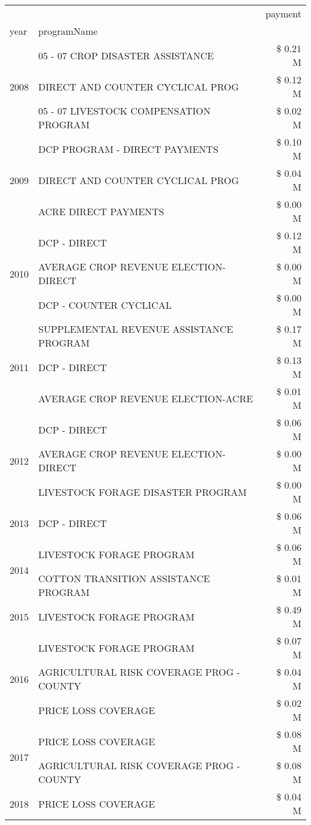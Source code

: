 \begin{tabular}{llr}
\toprule
 &  & payment \\
year & programName &  \\
\midrule
\multirow[t]{3}{*}{2008} & 05 - 07 CROP DISASTER ASSISTANCE & \$ 0.21 M \\
 & DIRECT AND COUNTER CYCLICAL PROG & \$ 0.12 M \\
 & 05 - 07 LIVESTOCK COMPENSATION PROGRAM & \$ 0.02 M \\
\cline{1-3}
\multirow[t]{3}{*}{2009} & DCP PROGRAM - DIRECT PAYMENTS & \$ 0.10 M \\
 & DIRECT AND COUNTER CYCLICAL PROG & \$ 0.04 M \\
 & ACRE DIRECT PAYMENTS & \$ 0.00 M \\
\cline{1-3}
\multirow[t]{3}{*}{2010} & DCP - DIRECT & \$ 0.12 M \\
 & AVERAGE CROP REVENUE ELECTION-DIRECT & \$ 0.00 M \\
 & DCP - COUNTER CYCLICAL & \$ 0.00 M \\
\cline{1-3}
\multirow[t]{3}{*}{2011} & SUPPLEMENTAL REVENUE ASSISTANCE PROGRAM & \$ 0.17 M \\
 & DCP - DIRECT & \$ 0.13 M \\
 & AVERAGE CROP REVENUE ELECTION-ACRE & \$ 0.01 M \\
\cline{1-3}
\multirow[t]{3}{*}{2012} & DCP - DIRECT & \$ 0.06 M \\
 & AVERAGE CROP REVENUE ELECTION-DIRECT & \$ 0.00 M \\
 & LIVESTOCK FORAGE DISASTER PROGRAM & \$ 0.00 M \\
\cline{1-3}
2013 & DCP - DIRECT & \$ 0.06 M \\
\cline{1-3}
\multirow[t]{2}{*}{2014} & LIVESTOCK FORAGE PROGRAM & \$ 0.06 M \\
 & COTTON TRANSITION ASSISTANCE PROGRAM & \$ 0.01 M \\
\cline{1-3}
2015 & LIVESTOCK FORAGE PROGRAM & \$ 0.49 M \\
\cline{1-3}
\multirow[t]{3}{*}{2016} & LIVESTOCK FORAGE PROGRAM & \$ 0.07 M \\
 & AGRICULTURAL RISK COVERAGE PROG - COUNTY & \$ 0.04 M \\
 & PRICE LOSS COVERAGE & \$ 0.02 M \\
\cline{1-3}
\multirow[t]{2}{*}{2017} & PRICE LOSS COVERAGE & \$ 0.08 M \\
 & AGRICULTURAL RISK COVERAGE PROG - COUNTY & \$ 0.08 M \\
\cline{1-3}
\multirow[t]{2}{*}{2018} & PRICE LOSS COVERAGE & \$ 0.04 M \\

\end{tabular}
